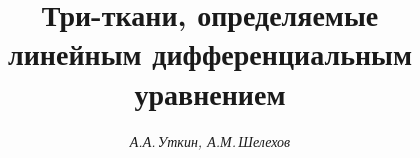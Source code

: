 

 


% 


 


\newcommand{\const}{\operatorname{const}} 


\newcommand{\tts}[1]{} 


 




 


\setcounter{page}{54} 












 


\author{\it А.А.\,Уткин, А.М.\,Шелехов} 




\title{Три-ткани, определяемые\\ линейным дифференциальным уравнением} 


 


\date{} 




\pagestyle{plain} %


 




\maketitle 


